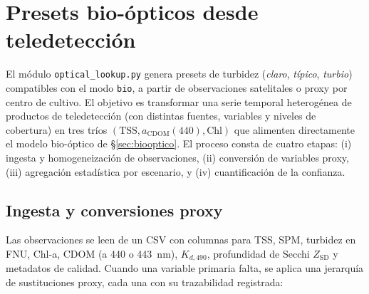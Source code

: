 \documentclass[11pt,a4paper]{article}
\newcommand{\si}[1]{\ensuremath{#1}}
\newcommand{\meter}{\mathrm{m}}
\newcommand{\nano}[1]{\mathrm{n}#1}
\newcommand{\code}[1]{\texttt{#1}}
\begin{document}
\section{Presets bio-ópticos desde teledetección}\label{sec:presets}

El módulo \code{optical\_lookup.py} genera presets de turbidez (\emph{claro},
\emph{típico}, \emph{turbio}) compatibles con el modo \code{bio}, a partir de
observaciones satelitales o proxy por centro de cultivo. El objetivo es transformar
una serie temporal heterogénea de productos de teledetección (con distintas fuentes,
variables y niveles de cobertura) en tres tríos $(\text{TSS}, a_\text{CDOM}(440),
\text{Chl})$ que alimenten directamente el modelo bio-óptico de
\S\ref{sec:biooptico}. El proceso consta de cuatro etapas: (i) ingesta y
homogeneización de observaciones, (ii) conversión de variables proxy, (iii)
agregación estadística por escenario, y (iv) cuantificación de la confianza.

\subsection{Ingesta y conversiones proxy}\label{sec:proxy}

Las observaciones se leen de un CSV con columnas para TSS, SPM, turbidez en FNU,
Chl-a, CDOM (a 440 o 443~\si{\nano\meter}), $K_{d,490}$, profundidad de Secchi
$Z_\text{SD}$ y metadatos de calidad. Cuando una variable primaria falta, se aplica
una jerarquía de sustituciones proxy, cada una con su trazabilidad registrada:
\end{document}
